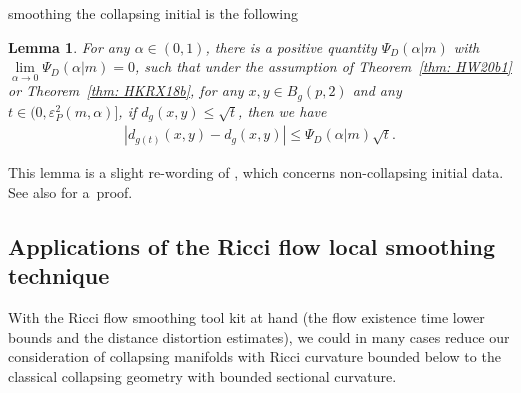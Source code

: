 \documentclass[pdftex]{sigma}
\numberwithin{equation}{section}
\newtheorem{Lemma}[Theorem]{Lemma}
\begin{document}
smoothing the collapsing initial is the following
\begin{Lemma}\label{lem: dis_dis1}
For any $\alpha\in (0,1)$, there is a positive quantity $\Psi_D(\alpha|m)$
with $\lim\limits_{\alpha\to 0}\Psi_D(\alpha|m)=0$, such that under the assumption of
Theorem~{\rm \ref{thm: HW20b1}} or Theorem~{\rm \ref{thm: HKRX18b}}, for any $x,y\in
B_g(p,2)$ and any $t\in \big(0,\varepsilon^2_P(m,\alpha)\big]$, if $d_g(x,y)\le
\sqrt{t}$, then we have
\begin{gather*}%
|d_{g(t)}(x,y)- d_g(x,y)| \le \Psi_D(\alpha|m)\sqrt{t}.
\end{gather*}
\end{Lemma}

This lemma is a slight re-wording of \cite[Lemma~1.11]{HKRX18}, which concerns
non-collapsing initial data. See also \cite[Lemma~4.1]{HW20b} for a~proof.

\subsection{Applications of the Ricci flow local smoothing technique}\label{section4.4}
With the Ricci flow smoothing tool kit at hand (the flow existence time lower
bounds and the distance distortion estimates), we could in many cases reduce our
consideration of collapsing manifolds with Ricci curvature bounded below to the
classical collapsing geometry with bounded sectional curvature.
\end{document}
